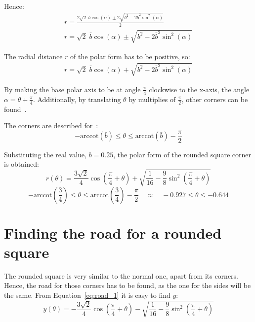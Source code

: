 \documentclass[12pt]{article}
\begin{document}
        Hence:
        \begin{align}
            r = \frac{2 \sqrt{2}\;\bar{b} \cos(\alpha) \pm 2 \sqrt{b^2 - 2\bar{b}^2 \sin^2(\alpha)}}{2} \\
            r = \sqrt{2}\;\bar{b} \cos(\alpha) \pm \sqrt{b^2 - 2\bar{b}^2 \sin^2(\alpha)}
        \end{align}

        The radial distance $r$ of the polar form has to be positive, so:
        \begin{align}
            r = \sqrt{2}\;\bar{b} \cos(\alpha) + \sqrt{b^2 - 2\bar{b}^2 \sin^2(\alpha)}
        \end{align}

        By making the base polar axis to be at angle $\frac{\pi}{4}$ clockwise to the x-axis, the angle $\alpha = \theta + \frac{\pi}{4}$. Additionally, by translating $\theta$ by multiplies of $\frac{\pi}{2}$, other corners can be found~\cite{bridge_wolfram}.

        The corners are described for~\cite{bridge_wolfram}:
        \[- \text{arccot}(\bar{b}) \leq \theta \leq \text{arccot}(\bar{b}) - \frac{\pi}{2}\]

        Substituting the real value, $b=0.25$, the polar form of the rounded square corner is obtained:
        \begin{equation}
            r(\theta) = \frac{3\sqrt{2}}{4} \cos (\frac{\pi}{4} + \theta) + \sqrt{\frac{1}{16} - \frac{9}{8} \sin^2 (\frac{\pi}{4}+\theta)}
        \end{equation}
        \[- \text{arccot}(\frac{3}{4}) \leq \theta \leq \text{arccot}(\frac{3}{4}) - \frac{\pi}{2} \quad \approx \quad -0.927 \leq \theta \leq -0.644\]

    \section{Finding the road for a rounded square}

        The rounded square is very similar to the normal one, apart from its corners. Hence, the road for those corners has to be found, as the one for the sides will be the same. From Equation~\ref{eq:road_1} it is easy to find $y$:
        \begin{equation}\label{eq:rounded_ytheta}
            y(\theta) = - \frac{3\sqrt{2}}{4} \cos (\frac{\pi}{4} + \theta) - \sqrt{\frac{1}{16} - \frac{9}{8} \sin^2 (\frac{\pi}{4}+\theta)}
        \end{equation}
\end{document}

